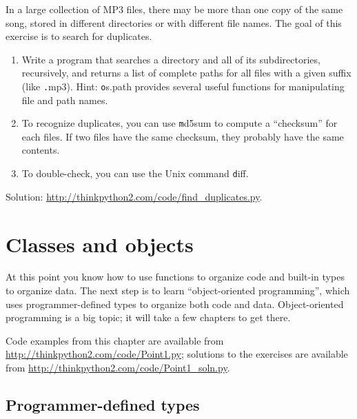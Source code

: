 \documentclass[
DIV=11,
fontsize=12,
twoside,
headinclude=false,
titlepage=firstiscover,
abstract=true,
headsepline=true,
footsepline=true,
chapterprefix=true, %
headings=big,
bibliography=totoc,%
captions=tableheading
]{scrbook}
\theoremstyle{definition}
\begin{document}
\begin{exercise}
\normalfont
\label{checksum}

In a large collection of MP3 files, there may be more than one
copy of the same song, stored in different directories or with
different file names.  The goal of this exercise is to search for
duplicates.

\begin{enumerate}

\item Write a program that searches a directory and all of its
subdirectories, recursively, and returns a list of complete paths
for all files with a given suffix (like {\texttt .mp3}).
Hint: {\texttt os.path} provides several useful functions for
manipulating file and path names.

\item To recognize duplicates, you can use {\texttt md5sum}
to compute a ``checksum'' for each files.  If two files have
the same checksum, they probably have the same contents.

\item To double-check, you can use the Unix command {\texttt diff}.

\end{enumerate}

Solution: \url{http://thinkpython2.com/code/find_duplicates.py}.

\end{exercise}



\chapter{Classes and objects}
\label{clobjects}

At this point you know how to use
functions to organize code and 
built-in types to organize data.  The next step is to learn
``object-oriented programming'', which uses programmer-defined types
to organize both code and data.  Object-oriented programming is
a big topic; it will take a few chapters to get there.

Code examples from this chapter are available from
\url{http://thinkpython2.com/code/Point1.py}; solutions
to the exercises are available from
\url{http://thinkpython2.com/code/Point1_soln.py}.


\section{Programmer-defined types}
\label{point}
\end{document}
